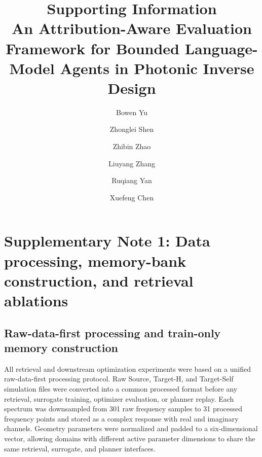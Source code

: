 \documentclass[final,1p,times]{elsarticle}
\begin{document}

\begin{frontmatter}

\title{Supporting Information\\
An Attribution-Aware Evaluation Framework for Bounded Language-Model Agents in Photonic Inverse Design}

\author[add1]{Bowen Yu}

\author[add1]{Zhonglei Shen}

\author[add1]{Zhibin Zhao}

\author[add1]{Liuyang Zhang}

\author[add1]{Ruqiang Yan}
\author[add1]{Xuefeng Chen}


\address[add1]{School of Mechanical Engineering, Xi'an Jiaotong University, Xi'an, Shaanxi, 710049, China.}



\end{frontmatter}



\section{Supplementary Note 1: Data processing, memory-bank construction, and retrieval ablations}

\subsection{Raw-data-first processing and train-only memory construction}

All retrieval and downstream optimization experiments were based on a unified raw-data-first processing protocol. Raw Source, Target-H, and Target-Self simulation files were converted into a common processed format before any retrieval, surrogate training, optimizer evaluation, or planner replay. Each spectrum was downsampled from 301 raw frequency samples to 31 processed frequency points and stored as a complex response with real and imaginary channels. Geometry parameters were normalized and padded to a six-dimensional vector, allowing domains with different active parameter dimensions to share the same retrieval, surrogate, and planner interfaces.
\end{document}
